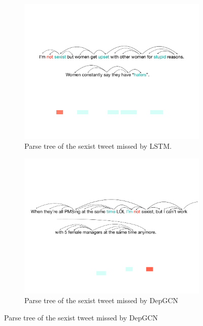 \begin{figure}[tbh]
  \begin{subfigure}{\textwidth}
  \centering
  \includegraphics[scale=0.65]{figures/Example1_key}
  \caption{Parse tree of the sexist tweet missed by LSTM.}
  \label{fig:sample}
  \end{subfigure}

  \begin{subfigure}{\textwidth}
    \centering
    \includegraphics[scale=0.6]{figures/example2_key}
    \caption{Parse tree of the sexist tweet missed by DepGCN}
    \label{fig:example}
  \end{subfigure}


\end{figure}
